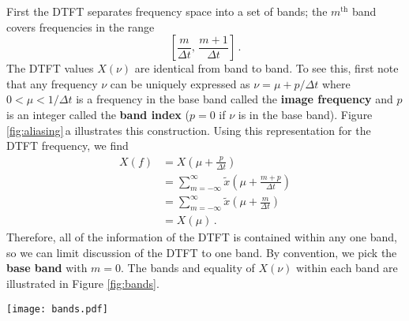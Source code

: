 First the DTFT separates frequency space into a set of bands; the $m^\text{th}$ band covers frequencies in the range
\begin{equation}
\left[ \frac{m}{\Delta t}, \, \frac{m+1}{\Delta t} \right] \, . \nonumber
\end{equation}
The DTFT values $X(\nu)$ are identical from band to band.
To see this, first note that any frequency $\nu$ can be uniquely expressed as $\nu = \mu + p / \Delta t$ where \mbox{$0 < \mu < 1/\Delta t$} is a frequency in the base band called the \textbf{image frequency} and $p$ is an integer called the \textbf{band index} ($p=0$ if $\nu$ is in the base band).
Figure \ref{fig:aliasing}\,a illustrates this construction.
Using this representation for the DTFT frequency, we find
\begin{align}
X(f)
&= X \left(\mu + \frac{p}{\Delta t} \right) \nonumber \\
&= \sum_{m=-\infty}^\infty \tilde{x}	\left(\mu + \frac{m + p}{\Delta t} \right) \nonumber \\
&= \sum_{m=-\infty}^\infty \tilde{x}	\left(\mu + \frac{m}{\Delta t} \right) \nonumber \\
&= X(\mu) \, .
\end{align}
Therefore, all of the information of the DTFT is contained within any one band, so we can limit discussion of the DTFT to one band.
By convention, we pick the \textbf{base band} with $m=0$.
The bands and equality of $X(\nu)$ within each band are illustrated in Figure \ref{fig:bands}.


\begin{figure*}[t]
\begin{centering}
\texttt{[image: bands.pdf]}
\par\end{centering}
\caption{The DTFT produces bands of with $1/\Delta t$. For \emph{any} $x_n$, the values of $X(\nu)$ within each band are identical.}
\label{fig:bands}
\end{figure*}

